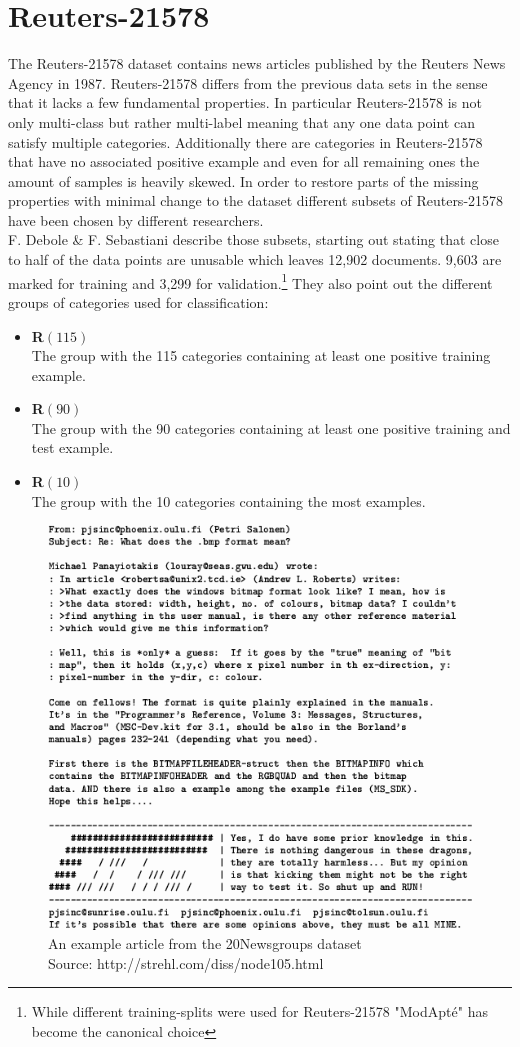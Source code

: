\section{Reuters-21578}
The Reuters-21578 dataset contains news articles published by the Reuters News Agency in 1987. Reuters-21578 differs from the previous data sets in the sense that it lacks a few fundamental properties. In particular Reuters-21578 is not only multi-class but rather multi-label meaning that any one data point can satisfy multiple categories. Additionally there are categories in Reuters-21578 that have no associated positive example and even for all remaining ones the amount of samples is heavily skewed. In order to restore parts of the missing properties with minimal change to the dataset different subsets of Reuters-21578 have been chosen by different researchers.\\
F. Debole \& F. Sebastiani \cite{Reuters-Subsets} describe those subsets, starting out stating that close to half of the data points are unusable which leaves 12,902 documents. 9,603 are marked for training and 3,299 for validation.\footnote{While different training-splits were used for Reuters-21578 "ModApt\'e" has become the canonical choice} They also point out the different groups of categories used for classification:
\begin{itemize}
	\item \textbf{R$\left(115\right)$}\\
	The group with the 115 categories containing at least one positive training example.\\ 
	\item \textbf{R$\left(90\right)$}\\
	The group with the 90 categories containing at least one positive training and test example.\\ 
	\item \textbf{R$\left(10\right)$}\\
	The group with the 10 categories containing the most examples. \\
\end{itemize} 


\begin{figure}
	\centering
	\includegraphics[width=450px]{gfx/6-Datasets/20Newsgroups_examples.png}
	\caption{
		An example article from the 20Newsgroups dataset\\
		Source: http://strehl.com/diss/node105.html
	}
	\label{fig:20Newsgroups-Examples}
\end{figure}